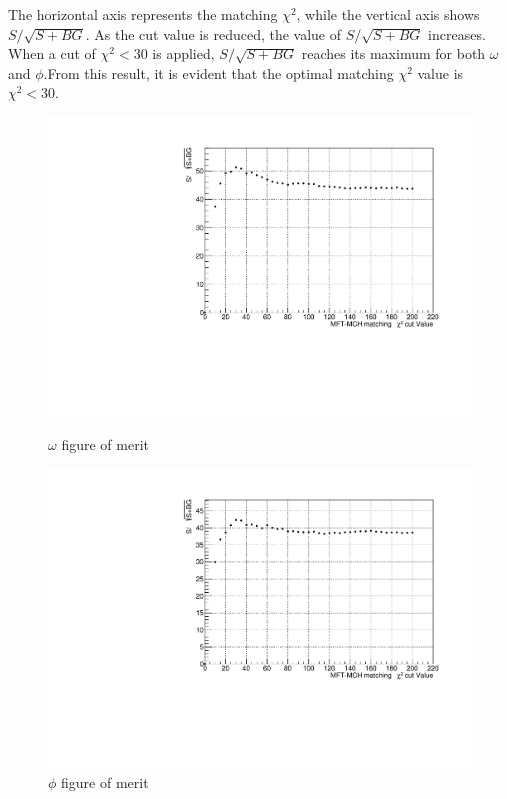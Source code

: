             The horizontal axis represents the matching \(\chi^2\), while the vertical axis shows \(S/\sqrt{S+BG}\). As the cut value is reduced, the value of \(S/\sqrt{S+BG}\) increases. When a cut of \(\chi^2<30\) is applied, \(S/\sqrt{S+BG}\) reaches its maximum for both \(\omega\) and \(\phi\).\@ From this result, it is evident that the optimal matching \(\chi^2\) value is \(\chi^2<30\).\@
            \begin{figure}[htbp]
                \centering
                \begin{minipage}{0.45\textwidth} %
                    \centering
                    \includegraphics[width=\textwidth]{fig/3_4_4_omega_significance.pdf} %
                    \caption{$\omega$ figure of merit}
                    \label{fig:omega_significance}
                \end{minipage}
                \hfill
                \begin{minipage}{0.45\textwidth}
                    \centering
                    \includegraphics[width=\textwidth]{fig/3_4_4_phi_significance.pdf} %
                    \caption{$\phi$ figure of merit}
                    \label{fig:phi_significance}
                \end{minipage}
            \end{figure}

